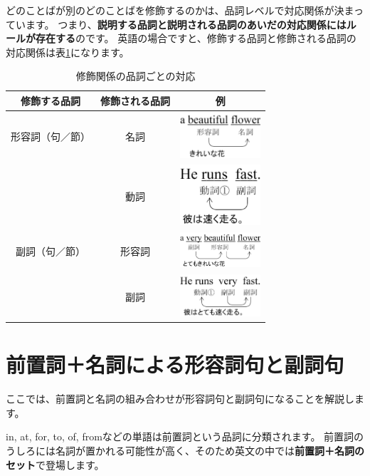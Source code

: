 \documentclass[titlepage]{jsarticle}
\begin{document}
 どのことばが別のどのことばを修飾するのかは、品詞レベルで対応関係が決まっています。
 つまり、{\bf 説明する品詞と説明される品詞のあいだの対応関係にはルールが存在する}のです。
 英語の場合ですと、修飾する品詞と修飾される品詞の対応関係は表\ref{tab3}になります。
 \begin{table}[htbp]
  \begin{center}
   \caption{修飾関係の品詞ごとの対応}
   \begin{tabular}{|c|c|c|}
    \hline
    修飾する品詞 & 修飾される品詞 & 例 \\ \hline \hline
    形容詞（句／節） & 名詞 & \includegraphics[width=3cm]{./figure/tab3_1.pdf} \\
    \hline
    & 動詞 & \includegraphics[width=3cm]{./figure/tab3_2.pdf} \\ \cline{2-3}
    副詞（句／節）& 形容詞 & \includegraphics[width=3cm]{./figure/tab3_3.pdf} \\ \cline{2-3}
    & 副詞 & \includegraphics[width=3cm]{./figure/tab3_4.pdf} \\ \hline
   \end{tabular}
   \label{tab3}
  \end{center}
 \end{table}


 \section{前置詞＋名詞による形容詞句と副詞句}
 ここでは、前置詞と名詞の組み合わせが形容詞句と副詞句になることを解説します。
 
 in, at, for, to, of, fromなどの単語は前置詞という品詞に分類されます。
 前置詞のうしろには名詞が置かれる可能性が高く、そのため英文の中では{\bf 前置詞＋名詞のセット}で登場します。
\end{document}
